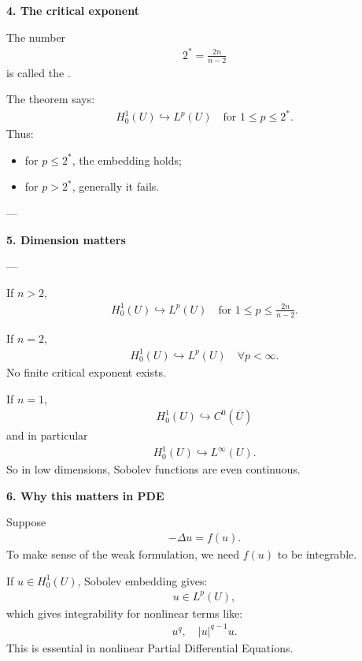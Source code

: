 \documentclass[12pt,a4paper]{report}
\begin{document}
\begin{description}
\begin{description}
\item \textbf{4. The critical exponent}

The number
\begin{align*}
2^*=\frac{2n}{n-2}
\end{align*}
is called the .

The theorem says:
\begin{align*}
H_0^1(U)\hookrightarrow L^p(U) \quad\text{for }1\le p\le 2^*.
\end{align*}
Thus:
\begin{itemize}
\item for $p\le 2^*$, the embedding holds;
\item for $p>2^*$, generally it fails.
\end{itemize}

---

\item \textbf{5. Dimension matters}

---

\begin{description}
\item If $n>2$,
\begin{align*}
H_0^1(U)\hookrightarrow L^p(U)
\quad\text{for }1\le p\le \frac{2n}{n-2}.
\end{align*}

\item If $n=2$,
\begin{align*}
H_0^1(U)\hookrightarrow L^p(U)
\quad\forall p<\infty.
\end{align*}
No finite critical exponent exists.

\item If $n=1$,
\begin{align*}
H_0^1(U)\hookrightarrow C^0(\overline U)
\end{align*}
and in particular
\begin{align*}
H_0^1(U)\hookrightarrow L^\infty(U).
\end{align*}
So in low dimensions, Sobolev functions are even continuous.
\end{description}

\item \textbf{6. Why this matters in PDE}

Suppose
\begin{align*}
-\Delta u=f(u).
\end{align*}
To make sense of the weak formulation, we need $f(u)$ to be integrable.

If $u\in H_0^1(U)$, Sobolev embedding gives:
\begin{align*}
u\in L^p(U),
\end{align*}
which gives integrability for nonlinear terms like:
\begin{align*}
u^q,\quad |u|^{q-1}u.
\end{align*}
This is essential in nonlinear Partial Differential Equations.


\end{description}
\end{description}
\end{document}
